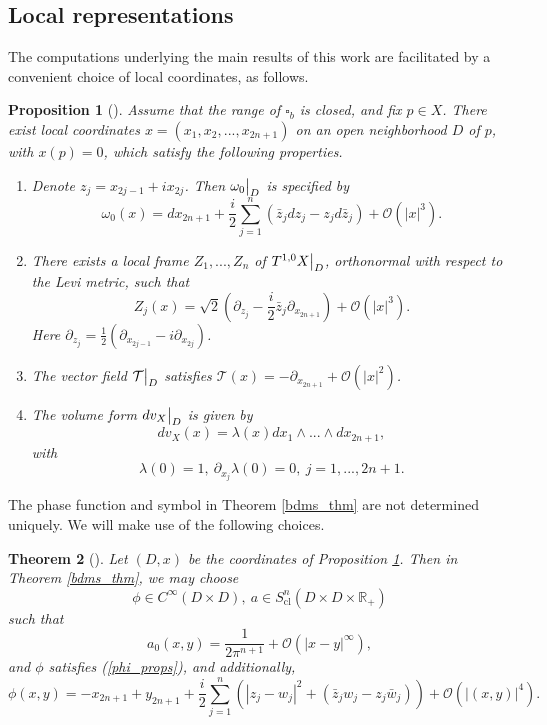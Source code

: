 \documentclass{article}
\newtheorem{theorem}{Theorem}[section]
\newtheorem{proposition}[theorem]{Proposition}
\newcommand{\RR}{\mathbb R}
\newcommand{\mct}{\mathcal T}
\newcommand{\mco}{\mathcal O}
\DeclareMathOperator{\cl}{cl}
\begin{document}
\subsection{Local representations}
The computations underlying the main results of this work are facilitated by a convenient choice of local coordinates, as follows.
%
\begin{proposition}[\cite{hsiao_shen}]\label{canonic_coor} Assume that the range of $\square_b$ is closed, and fix $p \in X$. There exist local coordinates $x= (x_1, x_2, ..., x_{2n+1})$ on an open neighborhood $D$ of $p$, with $x(p) = 0$, which satisfy the following properties.
%
\begin{enumerate}
%
\item{Denote $z_j = x_{2j-1} + i x_{2j}$. Then $\omega_0 \big{|}_D$ is specified by
\begin{equation*} \omega_0(x) = d x_{2n+1} + \frac i 2 \sum_{j=1}^n \left(\bar z_j dz_j - z_j d\bar z_j\right) + \mco(|x|^3).\end{equation*}}
%
\item{There exists a local frame $Z_1, ..., Z_n$ of $T^{1,0}X\big{|}_D$, orthonormal with respect to the Levi metric, such that
\begin{equation*} Z_j(x) = \sqrt 2 \left(\partial_{z_j} - \frac i 2 \bar z_j \partial_{x_{2n+1}} \right) + \mco(|x|^3).\end{equation*}Here $\partial_{z_j} = \frac 1 2 \left(\partial_{x_{2j-1}} - i \partial_{x_{2j}}\right)$. }
%
\item{The vector field $\mct\big{|}_D$ satisfies $\mct(x) = -\partial_{x_{2n+1}} +\mco(|x|^2)$.}
%
\item{The volume form $dv_X\big{|}_D$ is given by
\begin{equation*} dv_X(x) = \lambda(x) dx_1 \wedge ... \wedge dx_{2n+1},\end{equation*}
with
\begin{equation*} \lambda(0) = 1,\ \partial_{x_j} \lambda(0) = 0,\ j=1,...,2n+1.\end{equation*}}
%
\end{enumerate}
%
\end{proposition}
%
The phase function and symbol in Theorem \ref{bdms_thm} are not determined uniquely. We will make use of the following choices.
%
\begin{theorem}[\cite{hsiao_shen}]\label{hsiao_shen_thm} Let $(D,x)$ be the coordinates of Proposition \ref{canonic_coor}. Then in Theorem \ref{bdms_thm}, we may choose $$\phi \in C^\infty(D \times D),\ a \in S^n_{\cl}(D \times D \times \RR_+)$$ such that $$a_0(x,y) = \frac 1 {2\pi^{n+1}} + \mco(|x-y|^\infty),$$ and $\phi$ satisfies (\ref{phi_props}), and additionally,%
\begin{equation}\label{phi_a_forms}\phi(x,y) = -x_{2n+1} + y_{2n+1} + \frac i 2 \sum_{j=1}^n \left(|z_j - w_j|^2 + (\bar z_j w_j - z_j \bar w_j) \right) + \mco(|(x,y)|^4).\end{equation}
%
%
\end{theorem}
%
%
\end{document}
